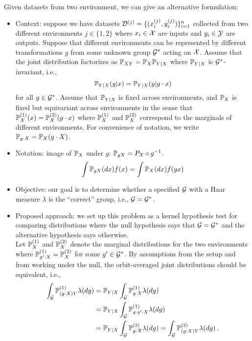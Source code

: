 Given datasets from two environment, we can give an alternative formulation:

\begin{itemize}

\item
Context: suppose we have datasets $\calD^{(j)}=\{(x_i^{(j)},y_i^{(j)})\}_{i=1}^n$ collected from two different environments $j\in\{1,2\}$ where $x_i\in\calX$ are inputs and $y_i\in\calY$ are outputs. Suppose that different environments can be represented by different transformations $g$ from some unknown group $\calG^*$ acting on $\calX$. Assume that the joint distribution factorizes as $\bbP_{XY}=\bbP_X\bbP_{Y|X}$ where $\bbP_{Y|X}$ is $\calG^*$-invariant, i.e.,
\[
\bbP_{Y|X}(y|x) = \bbP_{Y|X}(y|g\cdot x)
\]
for all $g\in\calG^*$. Assume that $\bbP_{Y|X}$ is fixed across environments, and $\bbP_X$ is fixed but equivariant across environments in the sense that $\bbP_X^{(1)}(x)=\bbP_X^{(2)}(g\cdot x)$ where $\bbP_X^{(1)}$ and $\bbP_X^{(2)}$ correspond to the marginals of different environments. For convenience of notation, we write $\bbP_{g\cdot X}=\bbP_X(g\cdot X)$.

\item
Notation: image of $\P_X$ under $g$: $\P_{gX} = P_{X} \circ g^{-1}$.
\[
\int \P_{gX}(dx) f(x) = \int \P_X(dx) f(gx)
\]

\item
Objective: our goal is to determine whether a specified $\calG$ with a Haar measure $\lambda$ is the ``correct'' group, i.e., $\calG=\calG^*$.

\item
Proposed approach: we set up this problem as a kernel hypothesis test for comparing distributions where the null hypothesis says that $\calG=\calG^*$ and the alternative hypothesis says otherwise.
\\

Let $\bbP_X^{(1)}$ and $\bbP_X^{(2)}$ denote the marginal distributions for the two environments where $\bbP_{g'\cdot X}^{(1)}=\bbP_X^{(2)}$ for some $g'\in\calG^*$. By assumptions from the setup and from working under the null, the orbit-averaged joint distributions should be equivalent, i.e.,
\begin{align*}
\int_{\calG}\bbP_{(g\cdot X)Y}^{(1)}\lambda(dg) &=
\bbP_{Y|X}\int_{\calG}\bbP_{g\cdot X}^{(1)}\lambda(dg) \\
&= \bbP_{Y|X}\int_{\calG}\bbP_{g\cdot g'\cdot X}^{(1)}\lambda(dg) \\
&= \bbP_{Y|X}\int_{\calG}\bbP_{g\cdot X}^{(2)}\lambda(dg) = \int_{\calG}\bbP_{(g\cdot X)Y}^{(2)}\lambda(dg) \;.
\end{align*}


\end{itemize}

